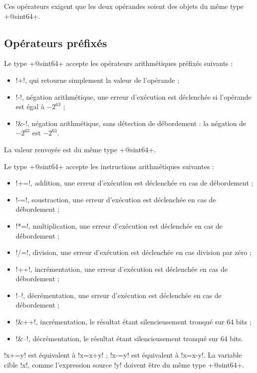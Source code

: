 Ces opérateurs exigent que les deux opérandes soient des objets du même type \ggs+@sint64+. 

\subsection{Opérateurs préfixés}
Le type \ggs+@sint64+ accepte les opérateurs arithmétiques préfixés suivants :
\begin{itemize}
  \item \ggs!+!, qui retourne simplement la valeur de l'opérande ;
  \item \ggs!-!, négation arithmétique, une erreur d'exécution est déclenchée si l'opérande est égal à $-2^{63}$ ;
  \item \ggs!&-!, négation arithmétique, sans détection de débordement : la négation de $-2^{63}$ est $-2^{63}$.
\end{itemize}

La valeur renvoyée est du même type  \ggs+@sint64+.



Le type \ggs+@sint64+ accepte les instructions arithmétiques suivantes :
\begin{itemize}
  \item \ggs!+=!, addition, une erreur d'exécution est déclenchée en cas de débordement ;
  \item \ggs!-=!, soustraction, une erreur d'exécution est déclenchée en cas de débordement ;
  \item \ggs!*=!, multiplication, une erreur d'exécution est déclenchée en cas de débordement ;
  \item \ggs!/=!, division, une erreur d'exécution est déclenchée en cas division par zéro ;
  \item \ggs!++!, incrémentation, une erreur d'exécution est déclenchée en cas de débordement ;
  \item \ggs!--!, décrémentation, une erreur d'exécution est déclenchée en cas de débordement ;
  \item \ggs!&++!, incrémentation, le résultat étant silencieusement tronqué sur 64 bits ;
  \item \ggs!&--!, décrémentation, le résultat étant silencieusement tronqué sur 64 bits.
\end{itemize}

\ggs!x+=y! est équivalent à \ggs!x=x+y! ; \ggs!x-=y! est équivalent à \ggs!x=x-y!.
La variable cible \ggs!x!, comme l'expression source \ggs!y! doivent être du même type \ggs+@sint64+. 

